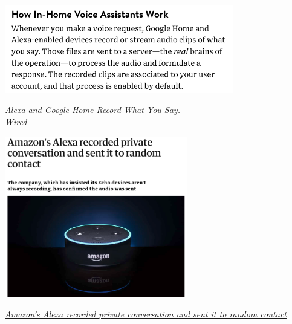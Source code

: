 \documentclass[17pt,aspectratio=169]{beamer}
\begin{document}
\begin{frame}[fragile]

  \begin{center}
  \includegraphics[width=10cm]{figs/home-assistants}
  \end{center}

  \begin{flushright}
    {\em
      \href{https://www.wired.com/2016/12/alexa-and-google-record-your-voice/}{Alexa and Google Home Record What You Say.} \\
      Wired \\
      }
  \end{flushright}
  
\end{frame}

\begin{frame}[fragile]

  \begin{center}
  \includegraphics[width=8cm]{figs/alexa-recorded}
  \end{center}

  \begin{flushright}
    {\em \tiny
      \href{https://www.theguardian.com/technology/2018/may/24/amazon-alexa-recorded-conversation}{Amazon's Alexa recorded private conversation and sent it to random contact}}
  \end{flushright}
  
\end{frame}
\end{document}
